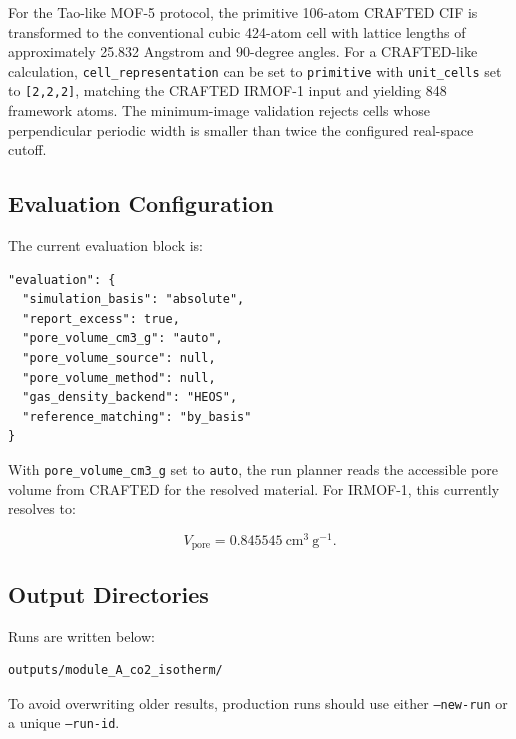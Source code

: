 For the Tao-like MOF-5 protocol, the primitive 106-atom CRAFTED CIF is transformed to the conventional cubic 424-atom cell with lattice lengths of approximately 25.832 Angstrom and 90-degree angles.
For a CRAFTED-like calculation, \texttt{cell\_representation} can be set to \texttt{primitive} with \texttt{unit\_cells} set to \texttt{[2,2,2]}, matching the CRAFTED IRMOF-1 input and yielding 848 framework atoms.
The minimum-image validation rejects cells whose perpendicular periodic width is smaller than twice the configured real-space cutoff.

\subsection{Evaluation Configuration}

The current evaluation block is:

\begin{lstlisting}
"evaluation": {
  "simulation_basis": "absolute",
  "report_excess": true,
  "pore_volume_cm3_g": "auto",
  "pore_volume_source": null,
  "pore_volume_method": null,
  "gas_density_backend": "HEOS",
  "reference_matching": "by_basis"
}
\end{lstlisting}

With \texttt{pore\_volume\_cm3\_g} set to \texttt{auto}, the run planner reads the accessible pore volume from CRAFTED for the resolved material.
For IRMOF-1, this currently resolves to:

\begin{equation}
    V_{\mathrm{pore}} = 0.845545~\mathrm{cm^3~g^{-1}}.
\end{equation}

\subsection{Output Directories}

Runs are written below:

\begin{lstlisting}
outputs/module_A_co2_isotherm/
\end{lstlisting}

To avoid overwriting older results, production runs should use either \texttt{--new-run} or a unique \texttt{--run-id}.
